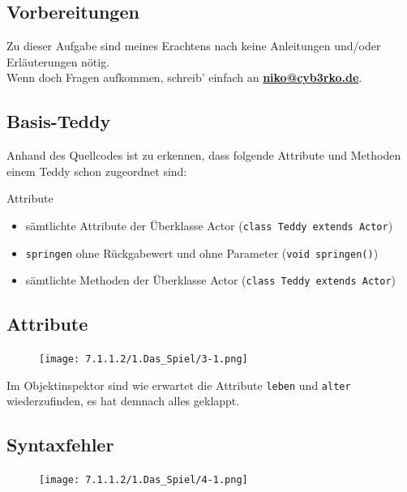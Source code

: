 \documentclass{scrartcl}   %
\begin{document}
\subsection{Vorbereitungen}

Zu dieser Aufgabe sind meines Erachtens nach keine Anleitungen und/oder Erläuterungen nötig.\\
Wenn doch Fragen aufkommen, schreib' einfach an \textbf{\href{mailto:niko@cyb3rko.de}{niko@cyb3rko.de}}.

\subsection{Basis-Teddy}

Anhand des Quellcodes ist zu erkennen, dass folgende Attribute und Methoden einem Teddy schon zugeordnet sind:

\begin{itemize}
    \barrow Attribute
    \begin{itemize}
    \item sämtlichte Attribute der Überklasse Actor (\texttt{class Teddy extends Actor})
    \end{itemize}
    \begin{itemize}
    \item \texttt{springen} ohne Rückgabewert und ohne Parameter (\texttt{void springen()})
    \item sämtlichte Methoden der Überklasse Actor (\texttt{class Teddy extends Actor})
    \end{itemize}
\end{itemize}

\subsection{Attribute}

\begin{figure}[ht]
	\centering
	\texttt{[image: 7.1.1.2/1.Das\_Spiel/3-1.png]}
\end{figure}

Im Objektinspektor sind wie erwartet die Attribute \texttt{leben} und \texttt{alter} wiederzufinden, es hat demnach alles geklappt.

\newpage

\subsection{Syntaxfehler}

\begin{figure}[ht]
	\centering
	\texttt{[image: 7.1.1.2/1.Das\_Spiel/4-1.png]}
\end{figure}
\end{document}
